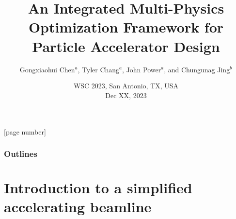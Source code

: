 \documentclass[aspectratio=169]{beamer}
\title{
An Integrated Multi-Physics Optimization Framework for Particle Accelerator Design}
\author{Gongxiaohui Chen$^{a}$, Tyler Chang$^{a}$, John Power$^{a}$, and
    Chungunag Jing$^{b}$}
\date{WSC 2023, San Antonio, TX, USA\\
Dec XX, 2023}
\institute{$^a$Argonne National Laboratory, $^b$Euclid TechLabs}
\begin{document}
{
\frame{\titlepage}
}

[page number]{}

\begin{frame}
  \frametitle{Outlines}
  \tableofcontents
\end{frame}

\section{Introduction to a simplified accelerating beamline}
\end{document}
